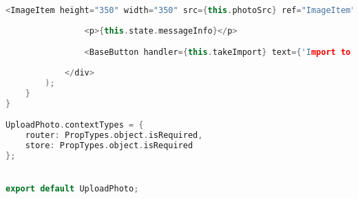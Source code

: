 \begin{lstlisting}[language=C++, style=cplusplusstyle]
                <ImageItem height="350" width="350" src={this.photoSrc} ref="ImageItem" />
                        
                <p>{this.state.messageInfo}</p>

                <BaseButton handler={this.takeImport} text={'Import to MedCard'}/>
                
            </div>
        );
    }
}

UploadPhoto.contextTypes = {
    router: PropTypes.object.isRequired,
    store: PropTypes.object.isRequired
};


export default UploadPhoto;
\end{lstlisting}
